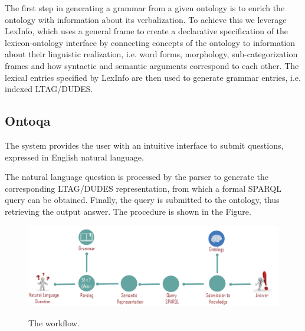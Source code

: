 The first step in generating a grammar from a given ontology is to enrich the ontology with information about its verbalization. To achieve this we leverage LexInfo, which uses a general frame to create a declarative specification of the lexicon-ontology interface by connecting concepts of the ontology to information about their linguistic realization, i.e. word forms, morphology, sub-categorization frames and how syntactic and semantic arguments correspond to each other. The lexical entries specified by LexInfo are then used to generate grammar entries, i.e. indexed LTAG/DUDES.

\subsection{Ontoqa}
The system provides the user with an intuitive interface to submit questions, expressed in English natural language.

The natural language question is processed by the parser to generate the corresponding LTAG/DUDES representation, from which a formal SPARQL query can be obtained.
Finally, the query is submitted to the ontology, thus retrieving the output answer.
The procedure is shown in the Figure.







\begin{figure}[H]
   \centering
    \includegraphics[scale=0.5]{./fig/ontoqa}
    \label{fig:ontoqa}
    \caption{The workflow.}
\end{figure}